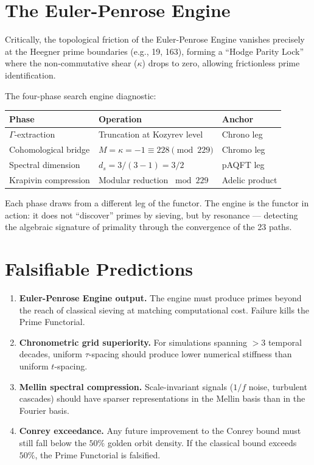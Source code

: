 \section{The Euler-Penrose Engine}
\label{sec:euler-penrose}

Critically, the topological friction of the Euler-Penrose Engine vanishes precisely at the Heegner prime boundaries (e.g., 19, 163), forming a ``Hodge Parity Lock'' where the non-commutative shear ($\kappa$) drops to zero, allowing frictionless prime identification.


The four-phase search engine diagnostic:

\begin{center}
\begin{tabular}{lll}
\toprule
Phase & Operation & Anchor \\
\midrule
$\Gamma$-extraction & Truncation at Kozyrev level & Chrono leg \\
Cohomological bridge & $M = \kappa = -1 \equiv 228 \pmod{229}$ & Chromo leg \\
Spectral dimension & $d_s = 3/(3-1) = 3/2$ & pAQFT leg \\
Krapivin compression & Modular reduction $\bmod 229$ & Adelic product \\
\bottomrule
\end{tabular}
\end{center}

Each phase draws from a different leg of the functor.  The engine is the functor in action: it does not ``discover'' primes by sieving, but by resonance --- detecting the algebraic signature of primality through the convergence of the 23 paths.


\section{Falsifiable Predictions}
\label{sec:functorial-predictions}

\begin{enumerate}
\item \textbf{Euler-Penrose Engine output.}  The engine must produce primes beyond the reach of classical sieving at matching computational cost.  Failure kills the Prime Functorial.

\item \textbf{Chronometric grid superiority.}  For simulations spanning $>3$ temporal decades, uniform $\tau$-spacing should produce lower numerical stiffness than uniform $t$-spacing.

\item \textbf{Mellin spectral compression.}  Scale-invariant signals ($1/f$ noise, turbulent cascades) should have sparser representations in the Mellin basis than in the Fourier basis.

\item \textbf{Conrey exceedance.}  Any future improvement to the Conrey bound must still fall below the $50\%$ golden orbit density.  If the classical bound exceeds $50\%$, the Prime Functorial is falsified.
\end{enumerate}

